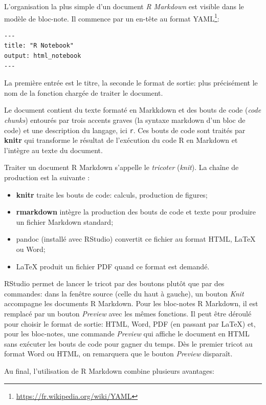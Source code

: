 \documentclass[
  11pt,
  french,
  a4paper,
  extrafontsizes,onecolumn,openright
  ]{memoir}
\providecommand{\tightlist}{%
  \setlength{\itemsep}{0pt}\setlength{\parskip}{0pt}}
\begin{document}
L'organisation la plus simple d'un document \emph{R Markdown} est visible dans le modèle de bloc-note.
Il commence par un en-tête au format YAML\footnote{\url{https://fr.wikipedia.org/wiki/YAML}}:

\begin{verbatim}
---
title: "R Notebook"
output: html_notebook
---
\end{verbatim}

La première entrée est le titre, la seconde le format de sortie: plus précisément le nom de la fonction chargée de traiter le document.

Le document contient du texte formaté en Markkdown et des bouts de code (\emph{code chunks}) entourés par trois accents graves (la syntaxe markdown d'un bloc de code) et une description du langage, ici \texttt{r}.
Ces bouts de code sont traités par \textbf{knitr} qui transforme le résultat de l'exécution du code R en Markdown et l'intègre au texte du document.

Traiter un document R Markdown s'appelle le \emph{tricoter} (\emph{knit}).
La chaîne de production est la suivante :

\begin{itemize}
\tightlist
\item
  \textbf{knitr} traite les bouts de code: calculs, production de figures;
\item
  \textbf{rmarkdown} intègre la production des bouts de code et texte pour produire un fichier Markdown standard;
\item
  pandoc (installé avec RStudio) convertit ce fichier au format HTML, LaTeX ou Word;
\item
  LaTeX produit un fichier PDF quand ce format est demandé.
\end{itemize}

RStudio permet de lancer le tricot par des boutons plutôt que par des commandes: dans la fenêtre source (celle du haut à gauche), un bouton \emph{Knit} accompagne les documents R Markdown.
Pour les bloc-notes R Markdown, il est remplacé par un bouton \emph{Preview} avec les mêmes fonctions.
Il peut être déroulé pour choisir le format de sortie: HTML, Word, PDF (en passant par LaTeX) et, pour les bloc-notes, une commande \emph{Preview} qui affiche le document en HTML sans exécuter les bouts de code pour gagner du temps.
Dès le premier tricot au format Word ou HTML, on remarquera que le bouton \emph{Preview} disparaît.

Au final, l'utilisation de R Markdown combine plusieurs avantages:
\end{document}
